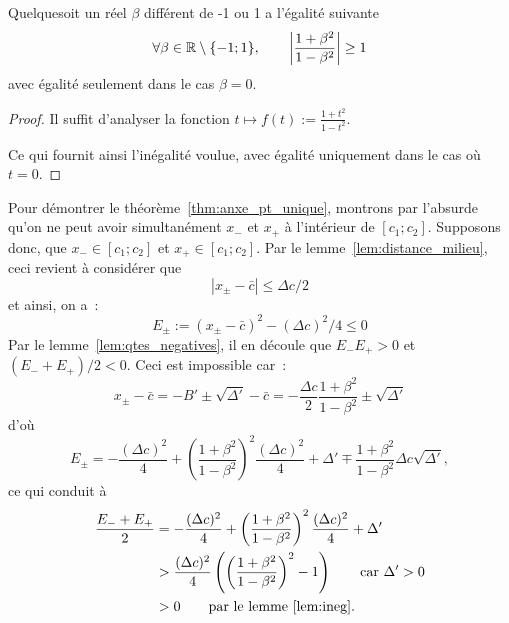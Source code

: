 \documentclass[main.tex]{subfiles}
\begin{document}
\begin{lemme}
\label{lem:ineg} Quelquesoit un réel $\beta$ différent de -1 ou 1 a l'égalité suivante 
\begin{equation}
\forall \beta \in \mathbb{R} \setminus \{ -1; 1 \}, \qquad  \left| \frac{1+\beta^2}{1-\beta^2} \right| \geq 1
\end{equation}
avec égalité seulement dans le cas $\beta=0$.
\end{lemme}
\begin{proof}
Il suffit d'analyser la fonction $t \mapsto f(t):= \frac{1+t^2}{1-t^2}$. 
\begin{center}
\end{center}
Ce qui fournit ainsi l'inégalité voulue, avec égalité uniquement dans le cas où~\mbox{$t=0$}.
\end{proof}


Pour démontrer le théorème~\ref{thm:anxe_pt_unique}, montrons par l'absurde qu'on ne peut avoir simultanément $x_-$ et $x_+$ à l'intérieur de $[c_1;c_2]$.
Supposons donc, que  $x_-\in[c_1;c_2]$ et $x_+\in[c_1;c_2]$. Par le lemme~\ref{lem:distance_milieu}, ceci revient à considérer que
$$| x_\pm-\bar{c} | \leq \Delta c / 2 $$
et ainsi, on a~:
$$ E_\pm := (x_\pm - \bar{c})^2 - (\Delta c)^2/4 \leq 0 $$
Par le lemme~\ref{lem:qtes_negatives}, il en découle que $E_-E_+ >0$ et $(E_-+E_+)/2 <0$. Ceci est impossible car~:
$$ x_\pm -\bar{c} = -B' \pm \sqrt{\Delta'} - \bar{c} =  -\frac{\Delta c}{2} \frac{1+\beta^2}{1-\beta^2} \pm \sqrt{\Delta'} $$
d'où
$$ E_\pm = - \frac{(\Delta c)^2}{4} + \left( \frac{1+\beta^2}{1-\beta^2} \right)^2 \frac{(\Delta c)^2}{4} +\Delta' \mp  \frac{1+\beta^2}{1-\beta^2} \Delta c \sqrt{\Delta'},  $$
ce qui conduit à
\begin{align*}
\frac{ E_-+E_+}{2} & = - \frac{(\Delta c)^2}{4} + \left( \frac{1+\beta^2}{1-\beta^2} \right)^2 \frac{(\Delta c)^2}{4} +\Delta' \\
& > \frac{(\Delta c)^2}{4} \left( \left( \frac{1+\beta^2}{1-\beta^2} \right)^2 - 1 \right) \qquad \textrm{car}\ \Delta' > 0 \\
&> 0  \qquad \textrm{par le lemme~\ref{lem:ineg}}.
\end{align*}
\end{document}
